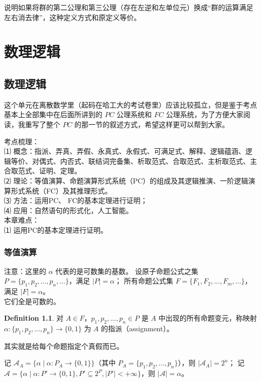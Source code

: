 \documentclass[oneside]{book}
\theoremstyle{definition}
\newtheorem{definition}{Definition}[section]
\begin{document}
说明如果将群的第二公理和第三公理（存在左逆和左单位元）换成“群的运算满足左右消去律”，这种定义方式和原定义等价。




\part{数理逻辑}
\chapter{数理逻辑}
这个单元在离散数学里（起码在哈工大的考试卷里）应该比较孤立，但是鉴于考点基本上全部集中在后面所讲到的 \(PC\) 公理系统和 \(FC\) 公理系统，为了方便大家阅读，我重写了整个 \(PC\) 的那一节的叙述方式，希望这样更可以帮到大家。

考点梳理：\\
⑴ 概念：指派、弄真、弄假、永真式、永假式、可满足式、解释、逻辑蕴涵、逻辑等价、对偶式、内否式、联结词完备集、析取范式、合取范式、主析取范式、主合取范式、证明、定理。\\
⑵ 理论：等值演算、命题演算形式系统（PC）的组成及其逻辑推演、一阶逻辑演算形式系统（FC）及其推理形式。\\
⑶ 方法：运用PC、 FC的基本定理进行证明；\\
⑷ 应用：自然语句的形式化，人工智能。\\
本章难点：\\
⑴ 运用PC的基本定理进行证明。
\section{等值演算}
注意：这里的 \( \alpha\) 代表的是可数集的基数。
设原子命题公式之集 \( P = \{ p_1, p_2, \dots, p_n, \dots \} \)，满足 \( |P| = \alpha \)；
所有命题公式集 \( F = \{ F_1, F_2, \dots, F_m, \dots \} \)，满足 \( |F| = \alpha \)。\\它们全是可数的。


\begin{definition}
	对 \( A \in F \)，\( p_1,p_2,\dots,p_n \in P \) 是 \( A \) 中出现的所有命题变元，称映射 \( \alpha: \{ p_1,p_2,\dots,p_n \} \to \{ 0,1 \} \) 为 \( A \) 的指派（assignment）。
\end{definition}
其实就是给每个命题指定个真假而已。

记 \( \mathscr{A}_A = \{ \alpha \mid \alpha: P_A \to \{ 0,1 \} \} \)（其中 \( P_A = \{ p_1,p_2,\dots,p_n \} \)），则 \( |\mathscr{A}_A| = 2^n \)；
记 \( \mathscr{A} = \{ \alpha \mid \alpha: P' \to \{ 0,1 \}, P' \subseteq 2^P, |P'| < +\infty \} \)，则 \( |\mathscr{A}| = \alpha \)。
\end{document}
